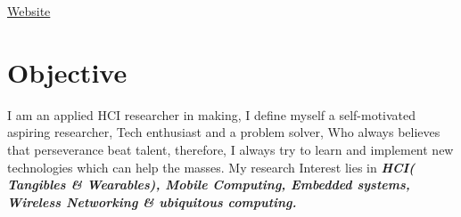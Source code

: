 \documentclass[10pt]{report}
\begin{document}
\hfill\faExternalLink\hspace{1pt}\href{https://sites.google.com/view/bhaskar-dutt}{\color{gray}Website}

\section*{\color{BlueViolet}\faLightbulbO\hspace{1pt} Objective} %
\normalfont I am an applied HCI researcher in making, I define myself a self-motivated aspiring researcher, Tech enthusiast and a problem solver, Who always believes that perseverance beat talent, therefore, I always try to learn and implement new technologies which can help the masses. My research Interest lies in\textbf{\emph{ HCI( Tangibles \& Wearables), Mobile Computing, Embedded systems, Wireless Networking \& ubiquitous computing.}}
\end{document}
